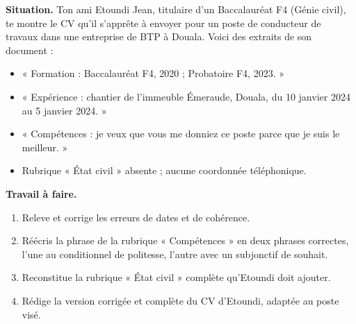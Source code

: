 \documentclass[11pt]{article}
\begin{document}
\begin{exercice}
\textbf{Situation.} Ton ami Etoundi Jean, titulaire d'un Baccalauréat F4 (Génie civil), te montre le CV qu'il s'apprête à envoyer pour un poste de conducteur de travaux dans une entreprise de BTP à Douala. Voici des extraits de son document :

\begin{itemize}
\item « Formation : Baccalauréat F4, 2020 ; Probatoire F4, 2023. »
\item « Expérience : chantier de l'immeuble Émeraude, Douala, du 10 janvier 2024 au 5 janvier 2024. »
\item « Compétences : je veux que vous me donniez ce poste parce que je suis le meilleur. »
\item Rubrique « État civil » absente ; aucune coordonnée téléphonique.
\end{itemize}

\textbf{Travail à faire.}
\begin{enumerate}
\item Releve et corrige les erreurs de dates et de cohérence.
\item Réécris la phrase de la rubrique « Compétences » en deux phrases correctes, l'une au conditionnel de politesse, l'autre avec un subjonctif de souhait.
\item Reconstitue la rubrique « État civil » complète qu'Etoundi doit ajouter.
\item Rédige la version corrigée et complète du CV d'Etoundi, adaptée au poste visé.
\end{enumerate}
\end{exercice}
\end{document}
